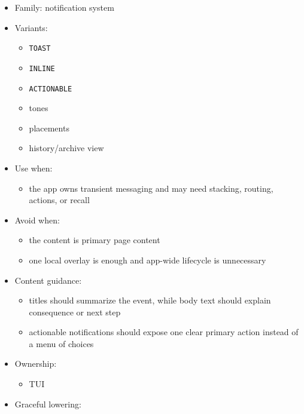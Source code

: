 \begin{itemize}
\tightlist
\item
  Family: notification system
\item
  Variants:

  \begin{itemize}
  \tightlist
  \item
    \texttt{T\allowbreak{}O\allowbreak{}A\allowbreak{}S\allowbreak{}T}
  \item
    \texttt{I\allowbreak{}N\allowbreak{}L\allowbreak{}I\allowbreak{}N\allowbreak{}E}
  \item
    \texttt{A\allowbreak{}C\allowbreak{}T\allowbreak{}I\allowbreak{}O\allowbreak{}N\allowbreak{}A\allowbreak{}B\allowbreak{}L\allowbreak{}E}
  \item
    tones
  \item
    placements
  \item
    history/archive view
  \end{itemize}
\item
  Use when:

  \begin{itemize}
  \tightlist
  \item
    the app owns transient messaging and may need stacking, routing, actions, or recall
  \end{itemize}
\item
  Avoid when:

  \begin{itemize}
  \tightlist
  \item
    the content is primary page content
  \item
    one local overlay is enough and app-wide lifecycle is unnecessary
  \end{itemize}
\item
  Content guidance:

  \begin{itemize}
  \tightlist
  \item
    titles should summarize the event, while body text should explain consequence or next step
  \item
    actionable notifications should expose one clear primary action instead of a menu of choices
  \end{itemize}
\item
  Ownership:

  \begin{itemize}
  \tightlist
  \item
    TUI
  \end{itemize}
\item
  Graceful lowering:


\end{itemize}
